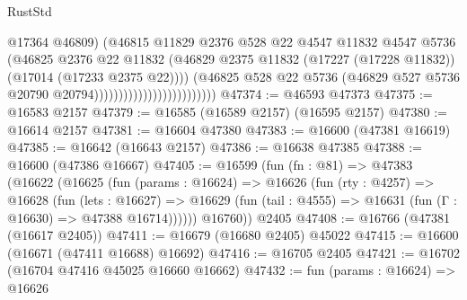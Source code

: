 \begin{lexlean}{RustStd}
\begin{coremodule}
{\begin{coremodule}
{{{{{{{{{{{{{{{{{{{{{{{{{{{{{{{{{{{{{{{{{{{{{{{{{{{{{{{                                                  @17364
                                                  @46809)
                                                (@46815
                                                  @11829
                                                  @2376
                                                  @528
                                                  @22
                                                  @4547
                                                  @11832
                                                  @4547
                                                  @5736
                                                  (@46825
                                                    @2376
                                                    @22
                                                    @11832
                                                    (@46829
                                                      @2375
                                                      @11832
                                                      (@17227 (@17228 @11832))
                                                      (@17014 (@17233 @2375 @22))))
                                                  (@46825
                                                    @528
                                                    @22
                                                    @5736
                                                    (@46829
                                                      @527
                                                      @5736
                                                      @20790
                                                      @20794)))))))))))))))))))))))))
@47374 := @46593 @47373
@47375 := @16583 @2157
@47379 := @16585 (@16589 @2157) (@16595 @2157)
@47380 := @16614 @2157
@47381 := @16604 @47380
@47383 := @16600 (@47381 @16619)
@47385 := @16642 (@16643 @2157)
@47386 := @16638 @47385
@47388 := @16600 (@47386 @16667)
@47405 := @16599
    (fun (fn : @81) =>
    @47383
      (@16622
        (@16625
          (fun (params : @16624) =>
          @16626
            (fun (rty : @4257) =>
            @16628
              (fun (lets : @16627) =>
              @16629 (fun (tail : @4555) => @16631 (fun (Γ : @16630) => @47388 @16714))))))
        @16760))
    @2405
@47408 := @16766 (@47381 (@16617 @2405))
@47411 := @16679 (@16680 @2405) @45022
@47415 := @16600 (@16671 (@47411 @16688) @16692)
@47416 := @16705 @2405
@47421 := @16702 (@16704 @47416 @45025 @16660 @16662)
@47432 := fun (params : @16624) =>
  @16626
}}}}}}}}}}}}}}}}}}}}}}}}}}}}}}}}}}}}}}}}}}}}}}}}}}}}}}}
\end{coremodule}}
\end{coremodule}
\end{lexlean}

